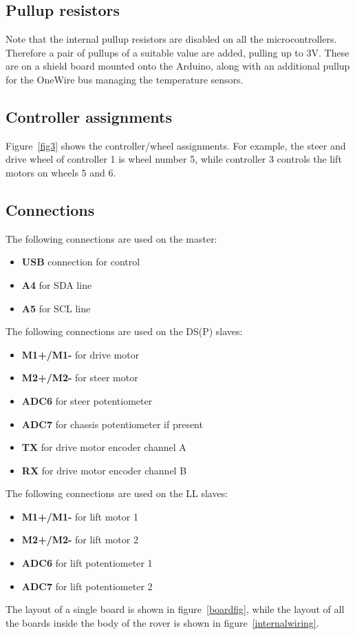\subsection{Pullup resistors}
Note that the \isqc{} internal pullup resistors are disabled on all
the microcontrollers. Therefore a pair of pullups of a suitable
value are added, pulling up to 3V. These are on a shield board mounted
onto the Arduino, along with an additional pullup for the OneWire bus
managing the temperature sensors.

\subsection{Controller assignments}
Figure~\ref{fig3} shows the controller/wheel assignments. For example,
the steer and drive wheel of controller 1 is wheel number 5, while
controller 3 controls the lift motors on wheels 5 and 6.

\subsection{Connections}
The following connections are used on the master:
\begin{itemize}
\item \textbf{USB} connection for control
\item \textbf{A4} for \isqc{} SDA line
\item \textbf{A5} for \isqc{} SCL line
\end{itemize}
The following connections are used on the DS(P) slaves:
\begin{itemize}
\item \textbf{M1+/M1-} for drive motor
\item \textbf{M2+/M2-} for steer motor
\item \textbf{ADC6} for steer potentiometer
\item \textbf{ADC7} for chassis potentiometer if present
\item \textbf{TX} for drive motor encoder channel A
\item \textbf{RX} for drive motor encoder channel B
\end{itemize}
The following connections are used on the LL slaves:
\begin{itemize}
\item \textbf{M1+/M1-} for lift motor 1
\item \textbf{M2+/M2-} for lift motor 2
\item \textbf{ADC6} for lift potentiometer 1
\item \textbf{ADC7} for lift potentiometer 2
\end{itemize}
The layout of a single board is shown in figure~\ref{boardfig}, while
the layout of all the boards inside the body of the rover is shown in
figure~\ref{internalwiring}.

